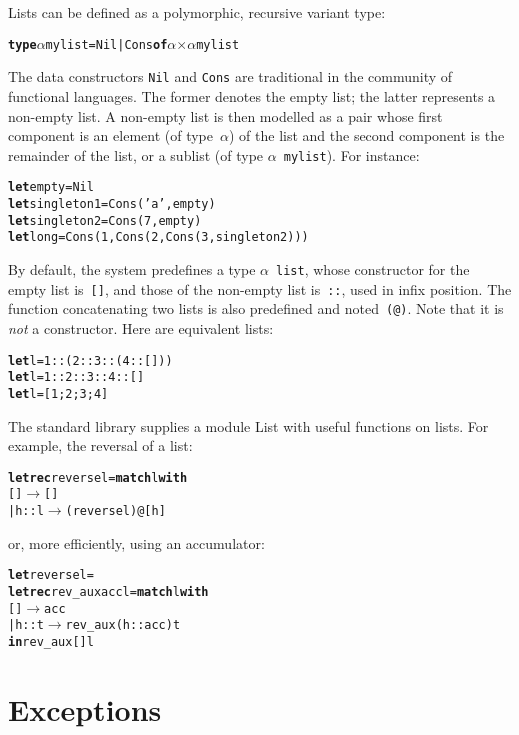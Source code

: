 Lists can be defined as a polymorphic, recursive variant type:
\begin{alltt}
\textbf{type} \(\alpha\) mylist = Nil | Cons \textbf{of} \(\alpha\) \(\times\) \(\alpha\) mylist
\end{alltt}
The data constructors \texttt{Nil} and \texttt{Cons} are traditional
in the community of functional languages. The former denotes the empty
list; the latter represents a non\hyp{}empty list. A non\hyp{}empty
list is then modelled as a pair whose first component is an element
(of type~\(\alpha\)) of the list and the second component is the
remainder of the list, or a sublist (of
type \(\alpha\)~\texttt{mylist}). For instance:
\begin{alltt}
\textbf{let} empty= Nil
\textbf{let} singleton1 = Cons ('a', empty)
\textbf{let} singleton2 = Cons (7, empty)
\textbf{let} long = Cons (1, Cons (2, Cons (3, singleton2)))
\end{alltt}
By default, the \OCaml system predefines a
type \(\alpha\)~\texttt{list}, whose constructor for the empty list
is~\texttt{[]}, and those of the non\hyp{}empty list is~\texttt{::},
used in infix position. The function concatenating two lists is also
predefined and noted~\texttt{(@)}. Note that it is \emph{not} a
constructor. Here are equivalent lists:
\begin{alltt}
\textbf{let} l = 1::(2::3::(4::[]))
\textbf{let} l = 1::2::3::4::[]
\textbf{let} l = [1;2;3;4]
\end{alltt}
The standard library supplies a module \textsf{List} with useful
functions on lists. For example, the reversal of a list:
\begin{alltt}
\textbf{let} \textbf{rec} reverse l = \textbf{match} l \textbf{with}
                      [] \(\rightarrow\) []
                    | h::l \(\rightarrow\) (reverse l) @ [h]
\end{alltt}
or, more efficiently, using an accumulator:
\begin{alltt}
\textbf{let} reverse l =
  \textbf{let rec} rev\_aux acc l = \textbf{match} l \textbf{with}
                            [] \(\rightarrow\) acc
                          | h::t \(\rightarrow\) rev\_aux (h::acc) t
\textbf{in} rev\_aux [] l
\end{alltt}

\section{Exceptions}

